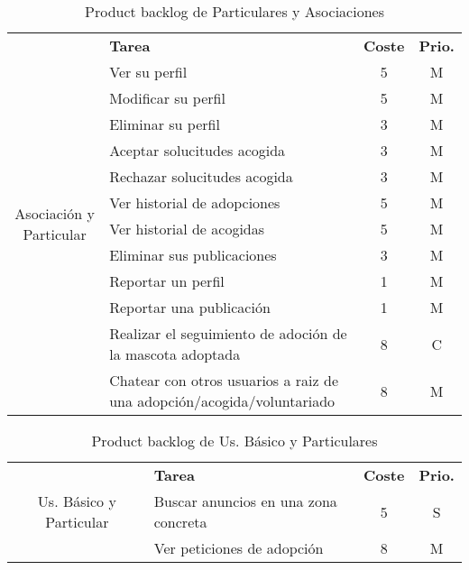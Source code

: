 \begin{table}[H]
    \centering
    \begin{tabular}{|c |p{8cm}|c |c|} \hline 
         \multirow[c]{15}{2cm}{Asociación y Particular}&  \textbf{Tarea}&  \textbf{Coste}& \textbf{Prio.}\\  \cline{2-4}

         &  Ver su perfil &  5& M\\ \cline{2-4}
         &  Modificar su perfil &  5& M\\ \cline{2-4}
         &  Eliminar su perfil &  3& M\\ \cline{2-4}
         
         &  Aceptar solucitudes acogida&  3& M\\ \cline{2-4}
         &  Rechazar solucitudes acogida&  3& M\\ \cline{2-4}
         
         &  Ver historial de adopciones &  5& M\\ \cline{2-4}
         &  Ver historial de acogidas &  5& M\\ \cline{2-4}
         &  Eliminar sus publicaciones &  3& M\\ \cline{2-4}

         &  Reportar un perfil &  1& M\\ \cline{2-4}
         &  Reportar una publicación &  1& M\\ \cline{2-4}
         
         &  Realizar el seguimiento de adoción de la mascota adoptada&  8& C\\ \cline{2-4}
         
         &  Chatear con otros usuarios a raiz de una adopción/acogida/voluntariado &  8& M\\ \hline

         
         
    \end{tabular}
    \caption{Product backlog de Particulares y Asociaciones}
    \label{tab:pb_aso_particular}
\end{table}

\begin{table}[H]
    \centering
    \begin{tabular}{|c |p{8cm}|c |c|} \hline 
         \multirow[c]{4}{2cm}{Us. Básico y Particular}&  \textbf{Tarea}&  \textbf{Coste}& \textbf{Prio.}\\  \cline{2-4}
         
		 &  Buscar anuncios en una zona concreta&  5& S\\ \cline{2-4}		
         &  Ver peticiones de adopción&  8& M\\ \hline

         
         
    \end{tabular}
    \caption{Product backlog de Us. Básico y Particulares}
    \label{tab:pb_part_usBasico}
\end{table}


